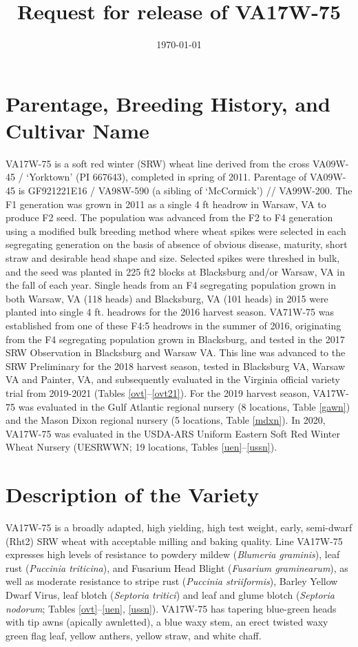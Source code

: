 \documentclass[12pt, letterpaper]{article}
\title{Request for release of VA17W-75}
\date{\today}
\begin{document}
\maketitle

\section{Parentage, Breeding History, and Cultivar Name}


VA17W-75 is a soft red winter (SRW) wheat line derived from the cross VA09W-45 / `Yorktown' (PI 667643), completed in spring of 2011.  Parentage of VA09W-45 is GF921221E16 / VA98W-590 (a sibling of `McCormick') // VA99W-200.  The F1 generation was grown in 2011 as a single 4 ft headrow in Warsaw, VA to produce F2 seed. The population was advanced from the F2 to F4 generation using a modified bulk breeding method where wheat spikes were selected in each segregating generation on the basis of absence of obvious disease, maturity, short straw and desirable head shape and size. Selected spikes were threshed in bulk, and the seed was planted in 225 ft2 blocks at Blacksburg and/or Warsaw, VA in the fall of each year. Single heads from an F4 segregating population grown in both Warsaw, VA (118 heads) and Blacksburg, VA (101 heads) in 2015 were planted into single 4 ft. headrows for the 2016 harvest season. VA71W-75 was established from one of these F4:5 headrows in the summer of 2016, originating from the F4 segregating population grown in Blacksburg, and tested in the 2017 SRW Observation in Blacksburg and Warsaw VA. This line was advanced to the SRW Preliminary for the 2018 harvest season, tested in Blacksburg VA, Warsaw VA and Painter, VA, and subsequently evaluated in the Virginia official variety trial from 2019-2021 (Tables \ref{ovt}--\ref{ovt21}). For the 2019 harvest season, VA17W-75 was evaluated in the Gulf Atlantic regional nursery (8 locations, Table \ref{gawn}) and the Mason Dixon regional nursery (5 locations, Table \ref{mdxn}). In 2020, VA17W-75 was evaluated in the USDA-ARS Uniform Eastern Soft Red Winter Wheat Nursery (UESRWWN; 19 locations, Tables \ref{uen}--\ref{ussn}). 

\section{Description of the Variety}

VA17W-75 is a broadly adapted, high yielding, high test weight, early, semi-dwarf (Rht2) SRW wheat with acceptable milling and baking quality.  Line VA17W-75 expresses high levels of resistance to powdery mildew (\textit{Blumeria graminis}), leaf rust (\textit{Puccinia triticina}), and Fusarium Head Blight (\textit{Fusarium graminearum}), as well as moderate resistance to stripe rust (\textit{Puccinia striiformis}), Barley Yellow Dwarf Virus, leaf blotch (\textit{Septoria tritici}) and leaf and glume blotch (\textit{Septoria nodorum}; Tables \ref{ovt}--\ref{uen}, \ref{ussn}). VA17W-75 has tapering blue-green heads with tip awns (apically awnletted), a blue waxy stem, an erect twisted waxy green flag leaf, yellow anthers, yellow straw, and white chaff.
\end{document}
